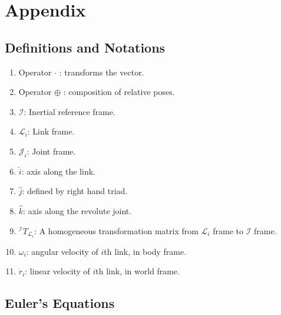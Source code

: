 \section{Appendix}
\subsection{Definitions and Notations}
\begin{enumerate}
    \item Operator $ \cdot $ : transforms the vector.
    \item Operator $\oplus$ : composition of relative poses.
    \item $\mathcal{I}$: Inertial reference frame.
    \item $\mathcal{L}_i$: Link frame.
    \item $\mathcal{J}_i$: Joint frame.
    \item $\hat{i}$: axis along the link.
    \item $\hat{j}$: defined by right hand triad.
    \item $\hat{k}$: axis along the revolute joint.
    \item $^\mathcal{I}T_{\mathcal{L}_i}$: A homogeneous transformation matrix from $\mathcal{L}_i$ frame to $\mathcal{I}$ frame.
    \item $\omega_i$: angular velocity of $i$th link, in body frame.
    \item $\dot{r}_i$: linear velocity of $i$th link, in world frame.
\end{enumerate}

\subsection{Euler's Equations}


\pagebreak